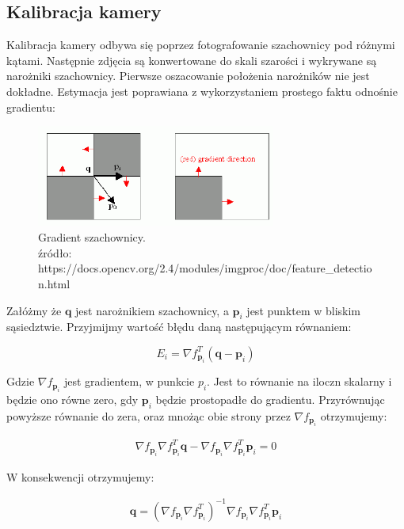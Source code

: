 \documentclass{article}
\newcommand{\bb}{\textbf}
\begin{document}
\subsection{Kalibracja kamery}

Kalibracja kamery odbywa się poprzez fotografowanie szachownicy pod różnymi kątami. Następnie zdjęcia są konwertowane do skali szarości i wykrywane są narożniki szachownicy. Pierwsze oszacowanie położenia narożników nie jest dokładne. Estymacja jest poprawiana z wykorzystaniem prostego faktu odnośnie gradientu:

\begin{figure}
\centering
	\includegraphics[width=0.70\textwidth]{cornersubpix.png}\par\vspace{1cm}
\caption{Gradient szachownicy. \\ źródło: https://docs.opencv.org/2.4/modules/imgproc/doc/feature\_detection.html}
	\label{fig:gradient}
\end{figure}

Załóżmy że $\bb{q}$ jest narożnikiem szachownicy, a $\bb{p}_i$ jest punktem w bliskim sąsiedztwie. Przyjmijmy wartość błędu daną następującym równaniem:

\begin{equation}
	E_i = \nabla f_{\bb{p}_i}^T (\bb{q} - \bb{p}_i)
\end{equation}

Gdzie $\nabla f_{\bb{p}_i}$ jest gradientem, w punkcie $p_i$. Jest to równanie na iloczn skalarny i będzie ono równe zero, gdy $\bb{p}_i$ będzie prostopadłe do gradientu. Przyrównując powyższe równanie do zera, oraz mnożąc obie strony przez $\nabla f_{\bb{p}_i}$ otrzymujemy:

\begin{align*}
	\nabla f_{\bb{p}_i} \nabla f_{\bb{p}_i}^T \bb{q} - \nabla f_{\bb{p}_i} \nabla f_{\bb{p}_i}^T \bb{p}_i = 0
\end{align*}

W konsekwencji otrzymujemy:

\begin{align}
	\bb{q} = (\nabla f_{\bb{p}_i} \nabla f_{\bb{p}_i}^T)^{-1} \nabla f_{\bb{p}_i} \nabla f_{\bb{p}_i}^T \bb{p}_i
\end{align}
\end{document}

